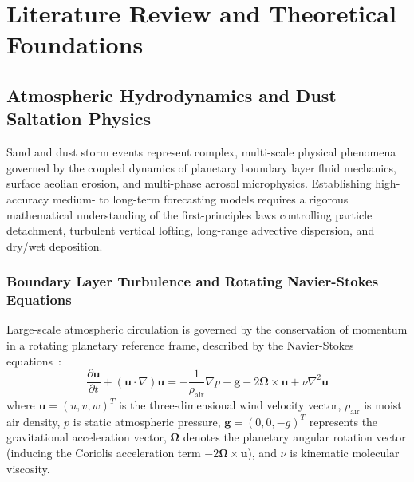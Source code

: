 
\chapter{Literature Review and Theoretical Foundations}
\label{chap:literature_review}

\section{Atmospheric Hydrodynamics and Dust Saltation Physics}
\label{sec:physics_foundations}

Sand and dust storm events represent complex, multi-scale physical phenomena governed by the coupled dynamics of planetary boundary layer fluid mechanics, surface aeolian erosion, and multi-phase aerosol microphysics. Establishing high-accuracy medium- to long-term forecasting models requires a rigorous mathematical understanding of the first-principles laws controlling particle detachment, turbulent vertical lofting, long-range advective dispersion, and dry/wet deposition.

\subsection{Boundary Layer Turbulence and Rotating Navier-Stokes Equations}
\label{subsec:navier_stokes}

Large-scale atmospheric circulation is governed by the conservation of momentum in a rotating planetary reference frame, described by the Navier-Stokes equations~\cite{shao2008physics}:
\begin{equation}
\label{eq:navier_stokes}
\frac{\partial \mathbf{u}}{\partial t} + (\mathbf{u} \cdot \nabla)\mathbf{u} = -\frac{1}{\rho_{\text{air}}}\nabla p + \mathbf{g} - 2\mathbf{\Omega} \times \mathbf{u} + \nu \nabla^2 \mathbf{u}
\end{equation}
where $\mathbf{u} = (u, v, w)^T$ is the three-dimensional wind velocity vector, $\rho_{\text{air}}$ is moist air density, $p$ is static atmospheric pressure, $\mathbf{g} = (0, 0, -g)^T$ represents the gravitational acceleration vector, $\mathbf{\Omega}$ denotes the planetary angular rotation vector (inducing the Coriolis acceleration term $-2\mathbf{\Omega} \times \mathbf{u}$), and $\nu$ is kinematic molecular viscosity.


